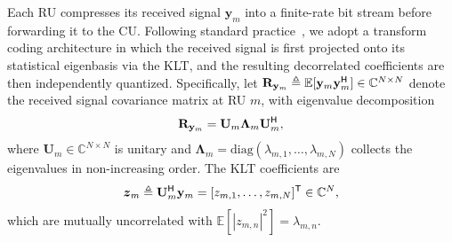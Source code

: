 \documentclass[10pt, twocolumn, comsoc]{IEEEtran}
\begin{document}
Each RU compresses its received signal $\mathbf{y}_m$ into a finite-rate bit stream before forwarding it to the CU.
Following standard practice~\cite{park2014fronthaul}, we adopt a transform coding architecture in which the received signal is first projected onto its statistical eigenbasis via the KLT, and the resulting decorrelated coefficients are then independently quantized. Specifically, let $\mathbf{R}_{\mathbf{y}_m} \triangleq \mathbb{E}[\mathbf{y}_m \mathbf{y}_m^{\sf H}] \in \mathbb{C}^{N \times N}$ denote the received signal covariance matrix at RU $m$, with eigenvalue decomposition
\begin{align}
  \mathbf{R}_{\mathbf{y}_m} = \mathbf{U}_m 
  \boldsymbol{\Lambda}_m \mathbf{U}_m^{\sf H},
\end{align}
where $\mathbf{U}_m \in \mathbb{C}^{N \times N}$ is unitary and $\boldsymbol{\Lambda}_m = \mathrm{diag}(\lambda_{m,1}, \dots, \lambda_{m,N})$ collects the eigenvalues in non-increasing order. 
The KLT coefficients are
\begin{align} \label{eq:klt}
  \boldsymbol{z}_m 
  \triangleq \mathbf{U}_m^{\sf H} \mathbf{y}_m 
  = [z_{m,1}, \dots, z_{m,N}]^{\sf T} 
  \in \mathbb{C}^{N},
\end{align}
which are mutually uncorrelated with $\mathbb{E}[|z_{m,n}|^2] = \lambda_{m,n}$.

\end{document}
